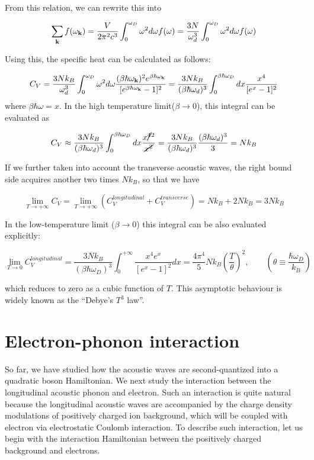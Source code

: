 From this relation, we can rewrite this into

\[\sum_{\bf k}f(\omega_{\bf k}) = \frac{V}{2\pi^2c^3}\int_0^{\omega_D} \omega^2d\omega f(\omega) = \frac{3N}{\omega_d^3}\int_0^{\omega_D} \omega^2d\omega f(\omega) \]

Using this, the specific heat can be calculated as follows:

\[C_V = \frac{3Nk_B}{\omega_d^3}\int_0^{\omega_D} \omega^2d\omega \frac{({\beta\hbar\omega_{\bf k}})^2e^{\beta\hbar\omega_{\bf k}}}{[e^{\beta\hbar\omega_{\bf k}} - 1]^2} = \frac{3Nk_B}{(\beta\hbar\omega_d)^3}\int_0^{\beta\hbar\omega_D} dx \frac{x^4}{[e^x - 1]^2} \]
where $\beta\hbar\omega = x$. In the high temperature limit($\beta\to0$), this integral can be evaluated as

\[C_V \approx\frac{3Nk_B}{(\beta\hbar\omega_d)^3}\int_0^{\beta\hbar\omega_D} dx \frac{x\cancel{^4}^2}{\cancel{x^2}} = \frac{3Nk_B}{(\beta\hbar\omega_d)^3}\frac{(\beta\hbar\omega_d)^3}{3} = Nk_B \]

If we further taken into account the transverse acoustic waves, the right bound side acquires another two times $Nk_B$, so that we have

\[\lim_{T\to+\infty}C_V = \lim_{T\to+\infty}\left(C_V^{longitudinal}+C_V^{transverse}\right) = Nk_B+2Nk_B = 3Nk_B \]

In the low-temperature limit ($\beta\to0$) this integral can be also evaluated explicitly:

\[\lim_{T\to0}C_V^{longitudinal} = \frac{3Nk_B}{(\beta\hbar\omega_D)^3}\int_0^{+\infty}\frac{x^4e^x}{[e^x-1]^2}dx = \frac{4\pi^4}{5}Nk_B\left(\frac{T}{\theta}\right)^2,\quad\quad\left(\theta \equiv \frac{\hbar\omega_D}{k_B}\right) \]

which reduces to zero as a cubic function of $T$. This asymptotic behaviour is widely known as the ``Debye's $T^3$ law''.


\section{Electron-phonon interaction} \label{se5-2}%

So far, we have studied how the acoustic waves are second-quantized into a quadratic boson Hamiltonian. We next study the interaction between the longitudinal acoustic phonon and electron. Such an interaction is quite natural because the longitudinal acoustic waves are accompanied by the charge density modulations of positively charged ion background, which will be coupled with electron via electrostatic Coulomb interaction. To describe such interaction, let us begin with the interaction Hamiltonian between the positively charged background and electrons.

